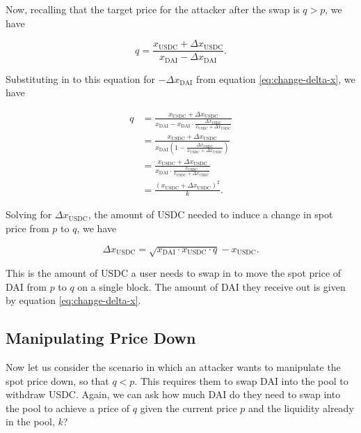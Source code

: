 \documentclass[a4paper, 11pt]{article}
\begin{document}
Now, recalling that the target price for the attacker after the swap is $q > p$, we have

\begin{equation}
q
=
\frac{x_{\text{USDC}} + \Delta x_{\text{USDC}}}{x_{\text{DAI}} - \Delta x_{\text{DAI}}}.
\end{equation}

Substituting in to this equation for $-\Delta x_{\text{DAI}}$ from equation \eqref{eq:change-delta-x}, we have

\begin{align}
q
&=
\frac{x_{\text{USDC}} + \Delta x_{\text{USDC}}}{x_{\text{DAI}} -x_{\text{DAI}} \cdot \frac{\Delta x_{\text{USDC}}}{x_{\text{USDC}} + \Delta x_{\text{USDC}}}} \\ \nonumber
&=
\frac{x_{\text{USDC}} + \Delta x_{\text{USDC}}}{x_{\text{DAI}} \left( 1 - \frac{\Delta x_{\text{USDC}}}{x_{\text{USDC}} + \Delta x_{\text{USDC}}} \right)} \\ \nonumber
&=
\frac{x_{\text{USDC}} + \Delta x_{\text{USDC}}}{x_{\text{DAI}} \cdot \frac{x_{\text{USDC}}}{x_{\text{USDC}} + \Delta x_{\text{USDC}}}} \\ \nonumber
&=
\frac{(x_{\text{USDC}} + \Delta x_{\text{USDC}})^2}{k}.
\end{align}

Solving for $\Delta x_{\text{USDC}}$, the amount of USDC needed to induce a change in spot price from $p$ to $q$, we have

\begin{equation}
\label{eq:delta-x-manipulated}
\Delta x_{\text{USDC}}
=
\sqrt{x_{\text{DAI}} \cdot x_{\text{USDC}} \cdot q} - x_{\text{USDC}}.
\end{equation}

This is the amount of USDC a user needs to swap in to move the spot price of DAI from $p$ to $q$ on a single block. The amount of DAI they receive out is given by equation \eqref{eq:change-delta-x}. 

\subsection{Manipulating Price Down}

Now let us consider the scenario in which an attacker wants to manipulate the spot price down, so that $q < p$. This requires them to swap DAI into the pool to withdraw USDC. Again, we can ask how much DAI do they need to swap into the pool to achieve a price of $q$ given the current price $p$ and the liquidity already in the pool, $k$?
\end{document}
